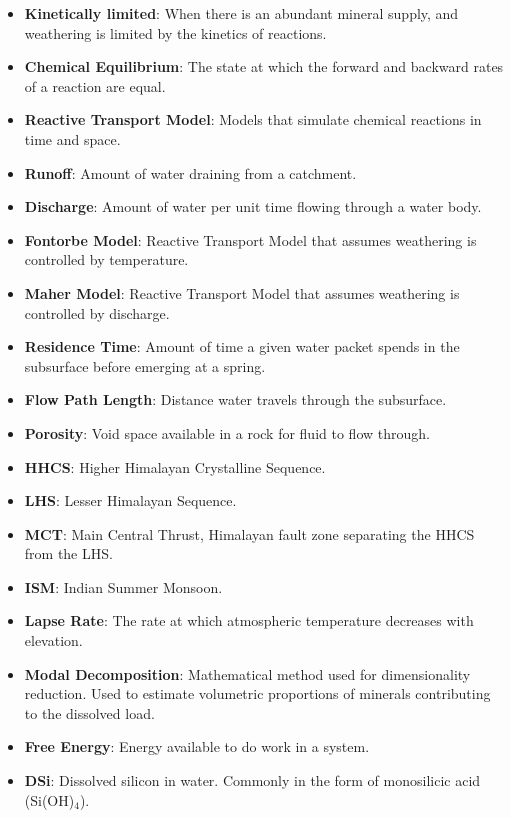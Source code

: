 \documentclass[hidelinks, 12pt]{article} %
\begin{document}
{\normalsize


\begin{itemize}[wide]
  \setlength{\itemindent}{-0mm}  %

  \item[] \textbf{Kinetically limited}: When there is an abundant mineral supply, and weathering is limited by the kinetics of reactions.
  \item[] \textbf{Chemical Equilibrium}: The state at which the forward and backward rates of a reaction are equal.
  \item[] \textbf{Reactive Transport Model}: Models that simulate chemical reactions in time and space.
  \item[] \textbf{Runoff}: Amount of water draining from a catchment.
  \item[] \textbf{Discharge}: Amount of water per unit time flowing through a water body.
  \item[] \textbf{Fontorbe Model}: Reactive Transport Model that assumes weathering is controlled by temperature.
  \item[] \textbf{Maher Model}: Reactive Transport Model that assumes weathering is controlled by discharge.
  \item[] \textbf{Residence Time}: Amount of time a given water packet spends in the subsurface before emerging at a spring.
  \item[] \textbf{Flow Path Length}: Distance water travels through the subsurface.
  \item[] \textbf{Porosity}: Void space available in a rock for fluid to flow through.
  \item[] \textbf{HHCS}: Higher Himalayan Crystalline Sequence.
  \item[] \textbf{LHS}: Lesser Himalayan Sequence.
  \item[] \textbf{MCT}: Main Central Thrust, Himalayan fault zone separating the HHCS from the LHS.
  \item[] \textbf{ISM}: Indian Summer Monsoon.
  \item[] \textbf{Lapse Rate}: The rate at which atmospheric temperature decreases with elevation.
  \item[] \textbf{Modal Decomposition}: Mathematical method used for dimensionality reduction. Used to estimate volumetric proportions of minerals contributing to the dissolved load.
  \item[] \textbf{Free Energy}: Energy available to do work in a system.
  \item[] \textbf{DSi}: Dissolved silicon in water. Commonly in the form of monosilicic acid (Si(OH)$_4$).



\end{itemize}

}
\end{document}
